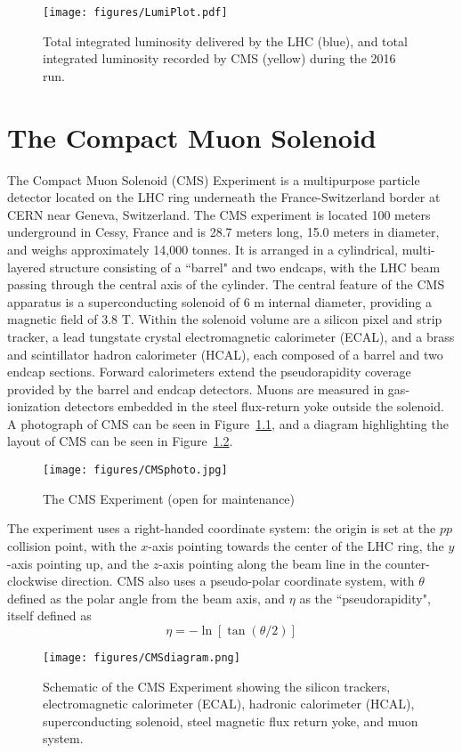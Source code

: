 \begin{figure}\centering
  \texttt{[image: figures/LumiPlot.pdf]}
  \caption{\label{fig:LumiPlot} Total integrated luminosity delivered by the LHC (blue), and total integrated luminosity recorded by CMS (yellow) during the 2016 run.}
\end{figure}


\chapter{The Compact Muon Solenoid}

The Compact Muon Solenoid (CMS) Experiment is a multipurpose particle detector located on the LHC ring underneath the France-Switzerland border at CERN near Geneva, Switzerland. The CMS experiment is located 100 meters underground in Cessy, France and is 28.7 meters long, 15.0 meters in diameter, and weighs approximately 14,000 tonnes. It is arranged in a cylindrical, multi-layered structure consisting of a ``barrel" and two endcaps, with the LHC beam passing through the central axis of the cylinder. The central feature of the CMS apparatus is a superconducting solenoid of 6 m internal diameter, providing a magnetic field of 3.8 T. Within the solenoid volume are a silicon pixel and strip tracker, a lead tungstate crystal electromagnetic calorimeter (ECAL), and a brass and scintillator hadron calorimeter (HCAL), each composed of a barrel and two endcap sections. Forward calorimeters extend the pseudorapidity coverage provided by the barrel and endcap detectors. Muons are measured in gas-ionization detectors embedded in the steel flux-return yoke outside the solenoid. A photograph of CMS can be seen in Figure~\ref{fig:CMSphoto}, and a diagram highlighting the layout of CMS can be seen in Figure~\ref{fig:CMSdiagram}.
\begin{figure}\centering
  \texttt{[image: figures/CMSphoto.jpg]}
  \caption{\label{fig:CMSphoto} The CMS Experiment (open for maintenance)}
\end{figure}
The experiment uses a right-handed coordinate system: the origin is set at the $pp$ collision point, with the $x$-axis pointing towards the center of the LHC ring, the $y$-axis pointing up, and the $z$-axis pointing along the beam line in the counter-clockwise direction. CMS also uses a pseudo-polar coordinate system, with $\theta$ defined as the polar angle from the beam axis, and $\eta$ as the ``pseudorapidity", itself defined as 
\begin{equation}
 \eta = -\ln\left[\tan\left(\theta/2\right)\right]
 \end{equation}
\begin{figure}\centering
  \texttt{[image: figures/CMSdiagram.png]}
  \caption{\label{fig:CMSdiagram} Schematic of the CMS Experiment showing the silicon trackers, electromagnetic calorimeter (ECAL), hadronic calorimeter (HCAL), superconducting solenoid, steel magnetic flux return yoke, and muon system.}
\end{figure}

